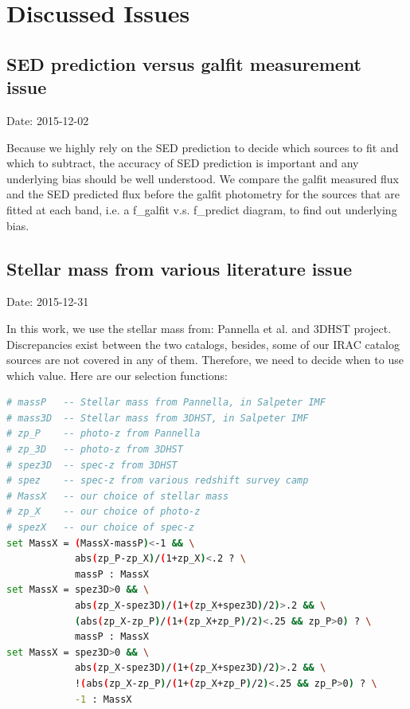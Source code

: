 \documentclass[11pt,a4paper]{article}
\begin{document}

\clearpage

\section{Discussed Issues}
\label{Appendix_DiscussedIssues}

\subsection{SED prediction versus galfit measurement issue}

\textcolor{green!90!black!60!orange}{Date: 2015-12-02}

Because we highly rely on the SED prediction to decide which sources to fit and which to subtract, the accuracy of SED prediction is important and any underlying bias should be well understood. We compare the galfit measured flux and the SED predicted flux before the galfit photometry for the sources that are fitted at each band, i.e. a f\_galfit v.s. f\_predict diagram, to find out underlying bias. 


\subsection{Stellar mass from various literature issue}

\textcolor{green!90!black!60!orange}{Date: 2015-12-31}

In this work, we use the stellar mass from: Pannella et al. and 3DHST project. Discrepancies exist between the two catalogs, besides, some of our IRAC catalog sources are not covered in any of them. Therefore, we need to decide when to use which value. Here are our selection functions:

\begin{lstlisting}[language=bash]
# massP   -- Stellar mass from Pannella, in Salpeter IMF
# mass3D  -- Stellar mass from 3DHST, in Salpeter IMF
# zp_P    -- photo-z from Pannella
# zp_3D   -- photo-z from 3DHST
# spez3D  -- spec-z from 3DHST
# spez    -- spec-z from various redshift survey camp
# MassX   -- our choice of stellar mass
# zp_X    -- our choice of photo-z
# spezX   -- our choice of spec-z
set MassX = (MassX-massP)<-1 && \
            abs(zp_P-zp_X)/(1+zp_X)<.2 ? \
            massP : MassX 
set MassX = spez3D>0 && \
            abs(zp_X-spez3D)/(1+(zp_X+spez3D)/2)>.2 && \
            (abs(zp_X-zp_P)/(1+(zp_X+zp_P)/2)<.25 && zp_P>0) ? \
            massP : MassX
set MassX = spez3D>0 && \
            abs(zp_X-spez3D)/(1+(zp_X+spez3D)/2)>.2 && \
            !(abs(zp_X-zp_P)/(1+(zp_X+zp_P)/2)<.25 && zp_P>0) ? \
            -1 : MassX
\end{lstlisting}
\end{document}
